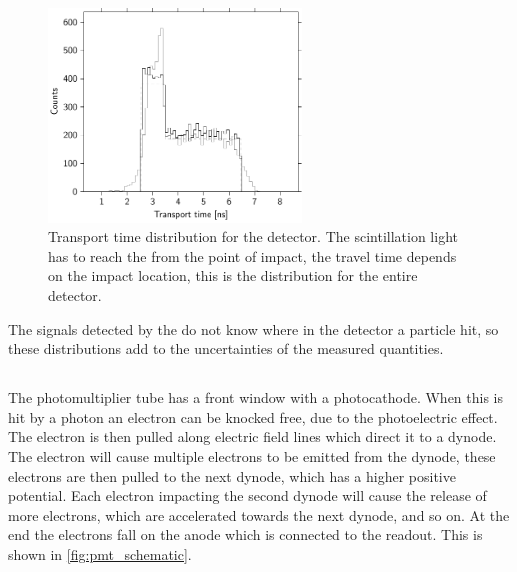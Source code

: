\begin{figure}
    \centering
    \includegraphics[width=0.6\textwidth]
                    {plots/station/transport_time}
    \caption{Transport time distribution for the detector. The scintillation light has to reach the \pmt from the point of impact, the travel time depends on the impact location, this is the distribution for the entire detector.}
    \label{fig:transport_time}
\end{figure}

The signals detected by the \pmt do not know where in the detector a particle hit, so these distributions add to the uncertainties of the measured quantities.


\subsection{\pmt}

The photomultiplier tube has a front window with a photocathode. When this is hit by a photon an electron can be knocked free, due to the photoelectric effect. The electron is then pulled along electric field lines which direct it to a dynode. The electron will cause multiple electrons to be emitted from the dynode, these electrons are then pulled to the next dynode, which has a higher positive potential. Each electron impacting the second dynode will cause the release of more electrons, which are accelerated towards the next dynode, and so on. At the end the electrons fall on the anode which is connected to the readout. This is shown in \cref{fig:pmt_schematic}.

